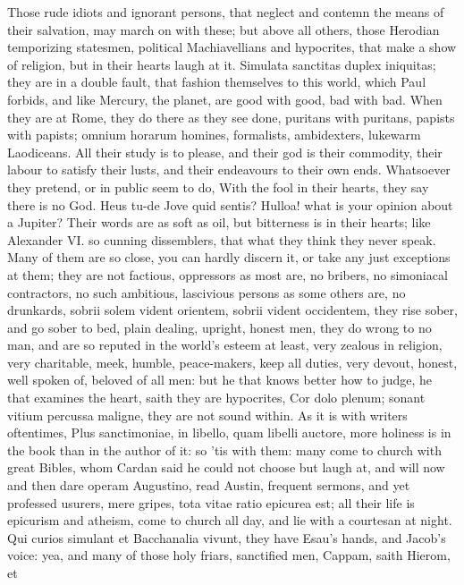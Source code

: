 {Those rude idiots and ignorant persons, that neglect and contemn the
means of their salvation, may march on with these; but above all
others, those Herodian temporizing statesmen, political Machiavellians
and hypocrites, that make a show of religion, but in their hearts laugh
at it. Simulata sanctitas duplex iniquitas; they are in a double fault,
that fashion themselves to this world, which Paul forbids, and
like Mercury, the planet, are good with good, bad with bad. When they
are at Rome, they do there as they see done, puritans with puritans,
papists with papists; omnium horarum homines, formalists, ambidexters,
lukewarm Laodiceans. All their study is to please, and their god
is their commodity, their labour to satisfy their lusts, and their
endeavours to their own ends. Whatsoever they pretend, or in public
seem to do, With the fool in their hearts, they say there is no
God. Heus tu-de Jove quid sentis? Hulloa! what is your opinion about a
Jupiter? Their words are as soft as oil, but bitterness is in their
hearts; like Alexander VI. so cunning dissemblers, that what they
think they never speak. Many of them are so close, you can hardly
discern it, or take any just exceptions at them; they are not factious,
oppressors as most are, no bribers, no simoniacal contractors, no such
ambitious, lascivious persons as some others are, no drunkards, sobrii
solem vident orientem, sobrii vident occidentem, they rise sober, and
go sober to bed, plain dealing, upright, honest men, they do wrong to
no man, and are so reputed in the world's esteem at least, very zealous
in religion, very charitable, meek, humble, peace-makers, keep all
duties, very devout, honest, well spoken of, beloved of all men: but he
that knows better how to judge, he that examines the heart, saith they
are hypocrites, Cor dolo plenum; sonant vitium percussa maligne, they
are not sound within. As it is with writers oftentimes, Plus
sanctimoniae, in libello, quam libelli auctore, more holiness is in the
book than in the author of it: so 'tis with them: many come to church
with great Bibles, whom Cardan said he could not choose but laugh at,
and will now and then dare operam Augustino, read Austin, frequent
sermons, and yet professed usurers, mere gripes, tota vitae ratio
epicurea est; all their life is epicurism and atheism, come to church
all day, and lie with a courtesan at night. Qui curios simulant et
Bacchanalia vivunt, they have Esau's hands, and Jacob's voice: yea, and
many of those holy friars, sanctified men, Cappam, saith Hierom, et
}
